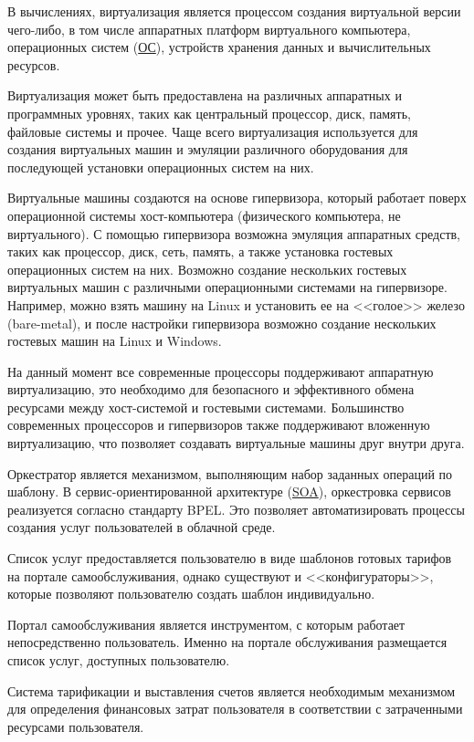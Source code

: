 В вычислениях, виртуализация является процессом создания виртуальной версии чего-либо, в том числе аппаратных платформ виртуального компьютера, операционных систем (\hyperlink{os}{ОС}), устройств хранения данных и вычислительных ресурсов.

Виртуализация может быть предоставлена на различных аппаратных и программных уровнях, таких как центральный процессор, диск, память, файловые системы и прочее.
Чаще всего виртуализация используется для создания виртуальных машин и эмуляции различного оборудования для последующей установки операционных систем на них.

Виртуальные машины создаются на основе гипервизора, который работает поверх операционной системы хост-компьютера (физического компьютера, не виртуального).
С помощью гипервизора возможна эмуляция аппаратных средств, таких как процессор, диск, сеть, память, а также установка гостевых операционных систем на них.
Возможно создание нескольких гостевых виртуальных машин с различными операционными системами на гипервизоре.
Например, можно взять машину на Linux и установить ее на <<голое>> железо (bare-metal), и после настройки гипервизора возможно создание нескольких гостевых машин на Linux и Windows.

На данный момент все современные процессоры поддерживают аппаратную виртуализацию, это необходимо для безопасного и эффективного обмена ресурсами между хост-системой и гостевыми системами.
Большинство современных процессоров и гипервизоров также поддерживают вложенную виртуализацию, что позволяет создавать виртуальные машины друг внутри друга.

Оркестратор является механизмом, выполняющим набор заданных операций по шаблону.
В сервис-ориентированной архитектуре (\hyperlink{soa}{SOA}), оркестровка сервисов реализуется согласно стандарту BPEL.
Это позволяет автоматизировать процессы создания услуг пользователей в облачной среде.

Список услуг предоставляется пользователю в виде шаблонов готовых тарифов на портале самообслуживания, однако существуют и <<конфигураторы>>, которые позволяют пользователю создать шаблон индивидуально.

Портал самообслуживания является инструментом, с которым работает непосредственно пользователь.
Именно на портале обслуживания размещается список услуг, доступных пользователю.

Система тарификации и выставления счетов является необходимым механизмом для определения финансовых затрат пользователя в соответствии с затраченными ресурсами пользователя.

